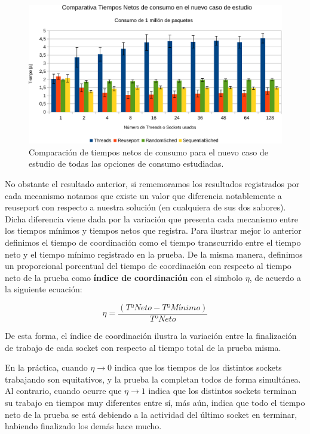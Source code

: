 \begin{figure}[!h]
	\centering
	\includegraphics[scale=.6]{resultados/modulovstodos1-crop.pdf}
	\caption{Comparación de tiempos netos de consumo para el nuevo caso de estudio de todas las opciones de consumo estudiadas.}
	\label{fig:resultadoMiModulovsTodos}
\end{figure}

No obstante el resultado anterior, si rememoramos los resultados registrados por cada mecanismo notamos que existe un valor que diferencia notablemente a reuseport con respecto a nuestra solución (en cualquiera de sus dos sabores). Dicha diferencia viene dada por la variación que presenta cada mecanismo entre los tiempos mínimos y tiempos netos que registra. Para ilustrar mejor lo anterior definimos el tiempo de coordinación como el tiempo transcurrido entre el tiempo neto y el tiempo mínimo registrado en la prueba. De la misma manera, definimos un proporcional porcentual del tiempo de coordinación con respecto al tiempo neto de la prueba como \textbf{índice de coordinación} con el simbolo $\eta$, de acuerdo a la siguiente ecuación:

\begin{equation}
\eta = \frac{\left(Tº Neto - Tº Mínimo\right)}{Tº Neto}
\end{equation}

De esta forma, el índice de coordinación ilustra la variación entre la finalización de trabajo de cada socket con respecto al tiempo total de la prueba misma. 

En la práctica, cuando $\eta\rightarrow 0$ indica que los tiempos de los distintos sockets trabajando son equitativos, y la prueba la completan todos de forma simultánea. Al contrario, cuando ocurre que $\eta \rightarrow 1$ indica que los distintos sockets terminan su trabajo en tiempos muy diferentes entre sí, más aún, indica que todo el tiempo neto de la prueba se está debiendo a la actividad del último socket en terminar, habiendo finalizado los demás hace mucho.


